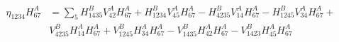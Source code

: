 \documentclass[aps,prl]{revtex4-2}
\begin{document}
    \begin{align}
    \eta_{1234}H^{A}_{67} &= \sum_{5} H^{B}_{1435}V^{A}_{42}H^{A}_{67} + H^{B}_{1234}V^{A}_{45}H^{A}_{67}- H^{B}_{4235}V^{A}_{14}H^{A}_{67} -H^{B}_{1245}V^{A}_{34}H^{A}_{67} +\\
    & V^{B}_{4235}H^{A}_{14}H^{A}_{67} + V^{B}_{1245}H^{A}_{34}H^{A}_{67} - V^{B}_{1435}H^{A}_{42}H^{A}_{67}-V^{B}_{1423}H^{A}_{45}H^{A}_{67}
    \end{align}
\end{document}
